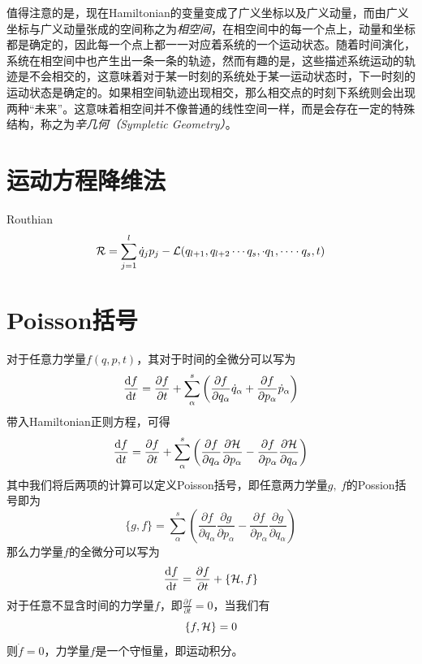 值得注意的是，现在Hamiltonian的变量变成了广义坐标以及广义动量，而由广义坐标与广义动量张成的空间称之为\textit{{相空间}}，在相空间中的每一个点上，动量和坐标都是确定的，因此每一个点上都一一对应着系统的一个运动状态。随着时间演化，系统在相空间中也产生出一条一条的轨迹，然而有趣的是，这些描述系统运动的轨迹是不会相交的，这意味着对于某一时刻的系统处于某一运动状态时，下一时刻的运动状态是确定的。如果相空间轨迹出现相交，那么相交点的时刻下系统则会出现两种“未来”。这意味着相空间并不像普通的线性空间一样，而是会存在一定的特殊结构，称之为\textit{辛几何（Sympletic Geometry）}。

\section{运动方程降维法}
Routhian 
\begin{equation}
    \mathcal{R} = \sum_{j=1}^l \dot q_j p_j - \mathcal{L}(q_{l+1},q_{l+2}\cdots q_s, \cdot q_1, \cdots\cdot q_s, t)
\end{equation}

\section{Poisson括号}
\label{sec:poisson_brak}
对于任意力学量$f(q,p,t)$，其对于时间的全微分可以写为
\begin{equation}
    \frac{\mathrm{d} f}{\mathrm{d} t} = \frac{\partial f}{\partial t} + \sum_\alpha^s\left( \frac{\partial f}{\partial q_\alpha}\dot q_\alpha + \frac{\partial f}{\partial p_\alpha}\dot p_\alpha \right)
\end{equation}
带入Hamiltonian正则方程，可得
\begin{equation}
    \frac{\mathrm{d} f}{\mathrm{d} t}= \frac{\partial f}{\partial t}+\sum_\alpha^s\left( \frac{\partial f}{\partial q_\alpha}\frac{\partial\mathcal{H}}{\partial p_\alpha} - \frac{\partial f}{\partial p_\alpha}\frac{\partial\mathcal{H}}{\partial q_\alpha} \right)
\end{equation}
其中我们将后两项的计算可以定义Poisson括号，即任意两力学量$g,~f$的Possion括号即为
\begin{equation}
    \{g,f\} = \sum_\alpha^s\left( \frac{\partial f}{\partial q_\alpha}\frac{\partial g}{\partial p_\alpha} - \frac{\partial f}{\partial p_\alpha}\frac{\partial g}{\partial q_\alpha} \right)
\end{equation}
那么力学量$f$的全微分可以写为
\begin{equation}
    \frac{\mathrm{d} f}{\mathrm{d} t} = \frac{\partial f}{\partial t} + \{\mathcal{H},f\}\label{eq:poissondef}
\end{equation}
对于任意不显含时间的力学量$f$，即$\frac{\partial f}{\partial t}=0$，当我们有
\begin{equation}
    \{ f,\mathcal{H}\} = 0
\end{equation}
则$\dot f=0$，力学量$f$是一个守恒量，即运动积分。

